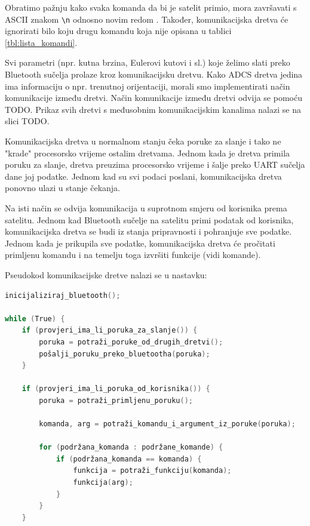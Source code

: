 \documentclass[times, utf8, diplomski, numeric]{templates/template}
\begin{document}
{{{{                Obratimo pažnju kako svaka komanda da bi je satelit primio, mora završavati s ASCII znakom \texttt{\textbackslash n} odnosno novim redom . Također, komunikacijska dretva će ignorirati bilo koju drugu komandu koja nije opisana u tablici \ref{tbl:lista_komandi}.

                Svi parametri (npr. kutna brzina, Eulerovi kutovi i sl.) koje želimo slati preko Bluetooth sučelja prolaze kroz komunikacijsku dretvu. Kako ADCS dretva jedina ima informaciju o npr. trenutnoj orijentaciji, morali smo implementirati način komunikacije između dretvi. Način komunikacije između dretvi odvija se pomoću TODO. Prikaz svih dretvi s međusobnim komunikacijskim kanalima nalazi se na slici TODO. 
                
                Komunikacijska dretva u normalnom stanju čeka poruke za slanje i tako ne "krade" procesorsko vrijeme ostalim dretvama. Jednom kada je dretva primila poruku za slanje, dretva preuzima procesorsko vrijeme i šalje preko UART sučelja dane joj podatke. Jednom kad su svi podaci poslani, komunikacijska dretva ponovno ulazi u stanje čekanja.
                
                Na isti način se odvija komunikacija u suprotnom smjeru od korisnika prema satelitu. Jednom kad Bluetooth sučelje na satelitu primi podatak od korisnika, komunikacijska dretva se budi iz stanja pripravnosti i pohranjuje sve podatke. Jednom kada je prikupila sve podatke, komunikacijska dretva će pročitati primljenu komandu i na temelju toga izvršiti funkcije (vidi komande).

                Pseudokod komunikacijske dretve nalazi se u nastavku:

                \begin{lstlisting}[language=C]
inicijaliziraj_bluetooth();

while (True) {
    if (provjeri_ima_li_poruka_za_slanje()) {
        poruka = potraži_poruke_od_drugih_dretvi();
        pošalji_poruku_preko_bluetootha(poruka);
    }

    if (provjeri_ima_li_poruka_od_korisnika()) {
        poruka = potraži_primljenu_poruku();

        komanda, arg = potraži_komandu_i_argument_iz_poruke(poruka);

        for (podržana_komanda : podržane_komande) {
            if (podržana_komanda == komanda) {
                funkcija = potraži_funkciju(komanda);
                funkcija(arg);
            }
        }
    }


\end{lstlisting}}}}}
\end{document}
